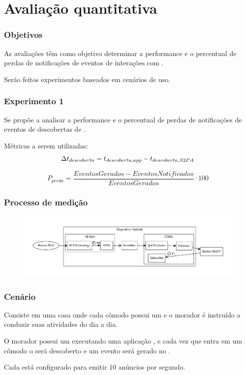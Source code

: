 \documentclass[aspectratio=169]{beamer}
\begin{document}
\section{Avaliação quantitativa}


\begin{frame}
	\frametitle{Objetivos}
	As avaliações têm como objetivo determinar a performance e o percentual de perdas de notificações de eventos de interações com \smartobjs.

	\bigskip

	Serão feitos experimentos baseados em cenários de uso.
\end{frame}

\begin{frame}
	\frametitle{Experimento 1}
	Se propõe a analisar a performance e o percentual de perdas de notificações de eventos de descobertas de \smartobjs.

	\bigskip
	
	Métricas a serem utilizadas:
	\begin{equation}
		\label{equ:performance-discovery}
		\Delta t_{descoberta} = t_{descoberta,app} - t_{descoberta,S2PA}
	\end{equation}
	
	\begin{equation}
		\label{equ:acuracy}
		P_{perda} = \frac{EventosGerados - EventosNotificados}{EventosGerados} \cdot 100
	\end{equation}
\end{frame}

\begin{frame}
	\frametitle{Processo de medição}
	\begin{figure}
		\centering
		\includegraphics[width=.85\linewidth]{img/performance-annotation.pdf}
	\end{figure}
\end{frame}

\begin{frame}
	\frametitle{Cenário}
	Consiste em uma casa onde cada cômodo possui um \beacon \ble e o morador é instruído a conduzir suas atividades do dia a dia.

	\bigskip
	
	O morador possui um \smartphone executando uma aplicação \mhubcddl, e cada vez que entra em um cômodo o \beacon será descoberto e um evento será gerado no \stwopa.

	\bigskip
	
	Cada \beacon está configurado para emitir 10 anúncios por segundo.
\end{frame}
\end{document}
